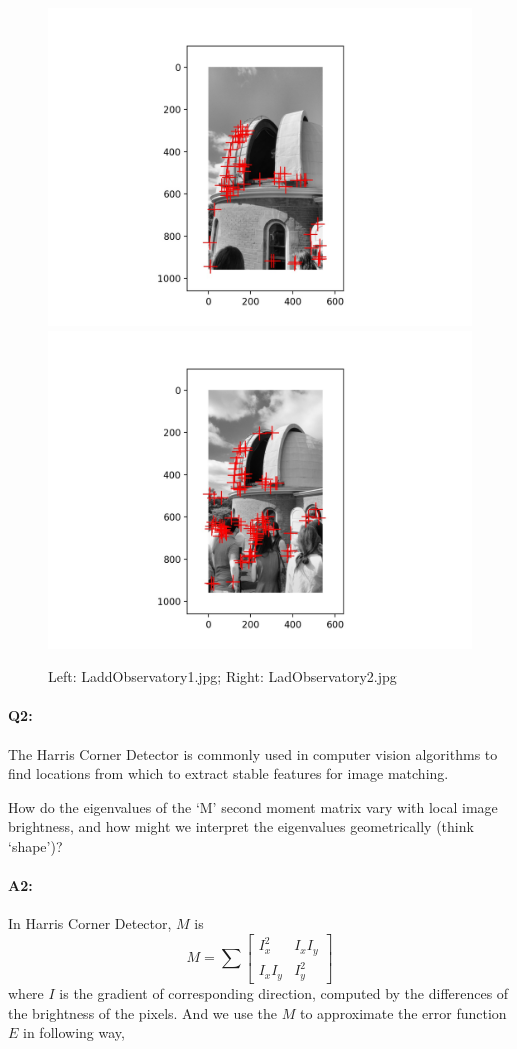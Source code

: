 \begin{figure}[htbp]
    \centering
    \includegraphics[width=0.49\linewidth]{Q1_LaddObservatory1.jpg}
    \includegraphics[width=0.49\linewidth]{Q1_LaddObservatory2.jpg}
    \caption{Left: LaddObservatory1.jpg; Right: LadObservatory2.jpg}
\end{figure}






\pagebreak
\paragraph{Q2:}
The Harris Corner Detector is commonly used in computer vision algorithms to find locations from which to extract stable features for image matching.

How do the eigenvalues of the `M' second moment matrix vary with local image brightness, and how might we interpret the eigenvalues geometrically (think `shape')?

\paragraph{A2:} 
In Harris Corner Detector, $M$ is 
\begin{equation*}
    M = \sum\begin{bmatrix}
        I_x^2 & I_xI_y \\
        I_xI_y & I_y^2
    \end{bmatrix}
\end{equation*}
where $I$ is the gradient of corresponding direction, computed by the differences of the brightness of the pixels. And we use the $M$ to approximate the error function $E$ in following way,

